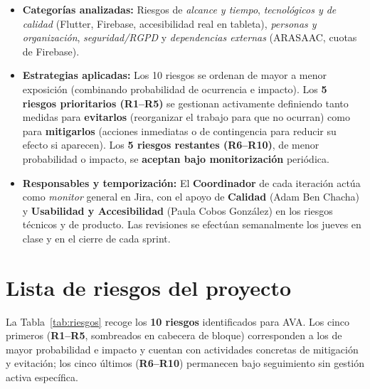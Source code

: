 \documentclass[11pt,a4paper]{article}
\begin{document}
\begin{itemize}
  \item \textbf{Categorías analizadas:} Riesgos de \textit{alcance y tiempo}, \textit{tecnológicos y de calidad} (Flutter, Firebase, accesibilidad real en tableta), \textit{personas y organización}, \textit{seguridad/RGPD} y \textit{dependencias externas} (ARASAAC, cuotas de Firebase).
  \item \textbf{Estrategias aplicadas:} Los 10 riesgos se ordenan de mayor a menor exposición (combinando probabilidad de ocurrencia e impacto). Los \textbf{5 riesgos prioritarios (R1--R5)} se gestionan activamente definiendo tanto medidas para \textbf{evitarlos} (reorganizar el trabajo para que no ocurran) como para \textbf{mitigarlos} (acciones inmediatas o de contingencia para reducir su efecto si aparecen). Los \textbf{5 riesgos restantes (R6--R10)}, de menor probabilidad o impacto, se \textbf{aceptan bajo monitorización} periódica.
  \item \textbf{Responsables y temporización:} El \textbf{Coordinador} de cada iteración actúa como \textit{monitor} general en Jira, con el apoyo de \textbf{Calidad} (Adam Ben Chacha) y \textbf{Usabilidad y Accesibilidad} (Paula Cobos González) en los riesgos técnicos y de producto. Las revisiones se efectúan semanalmente los jueves en clase y en el cierre de cada sprint.
\end{itemize}

\section{Lista de riesgos del proyecto}

La Tabla~\ref{tab:riesgos} recoge los \textbf{10 riesgos} identificados para AVA. Los cinco primeros (\textbf{R1--R5}, sombreados en cabecera de bloque) corresponden a los de mayor probabilidad e impacto y cuentan con actividades concretas de mitigación y evitación; los cinco últimos (\textbf{R6--R10}) permanecen bajo seguimiento sin gestión activa específica.
\end{document}
